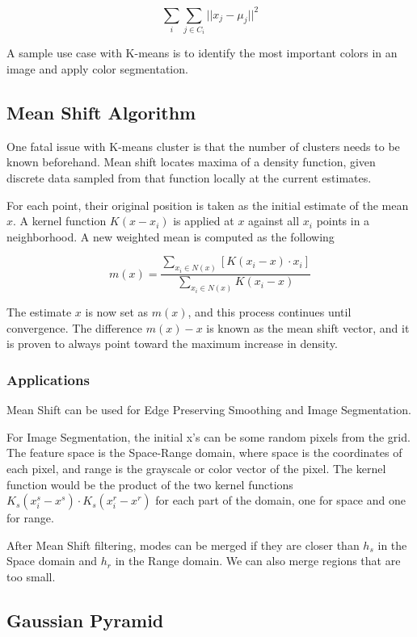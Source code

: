 \documentclass{article}
\begin{document}
\begin{multicols}{2}
$$
\sum_{i}\sum_{j \in C_i} ||x_j - \mu_j||^2
$$

A sample use case with K-means is to identify the most important colors in an image and apply color segmentation.

\subsection{Mean Shift Algorithm}

One fatal issue with K-means cluster is that the number of clusters needs to be known beforehand. Mean shift locates maxima of a density function, given discrete data sampled from that function locally at the current estimates.

For each point, their original position is taken as the initial estimate of the mean $x$. A kernel function $K(x-x_i)$ is applied at $x$ against all $x_i$ points in a neighborhood. A new weighted mean is computed as the following

$$
m(x) = \frac{\sum _{x_i \in N(x)}[K(x_i-x) \cdot x_i]}{\sum _{x_i \in N(x)}K(x_i-x)}
$$

The estimate $x$ is now set as $m(x)$, and this process continues until convergence. The difference $m(x) - x$ is known as the mean shift vector, and it is proven to always point toward the maximum increase in density.

\subsubsection{Applications}

Mean Shift can be used for Edge Preserving Smoothing and Image Segmentation. 

For Image Segmentation, the initial x's can be some random pixels from the grid. The feature space is the Space-Range domain, where space is the coordinates of each pixel, and range is the grayscale or color vector of the pixel. The kernel function would be the product of the two kernel functions $K_s(x_i^s - x^s) \cdot K_s(x_i^r - x^r)$ for each part of the domain, one for space and one for range.

After Mean Shift filtering, modes can be merged if they are closer than $h_s$ in the Space domain and $h_r$ in the Range domain. We can also merge regions that are too small.

\subsection{Gaussian Pyramid}


\end{multicols}
\end{document}
